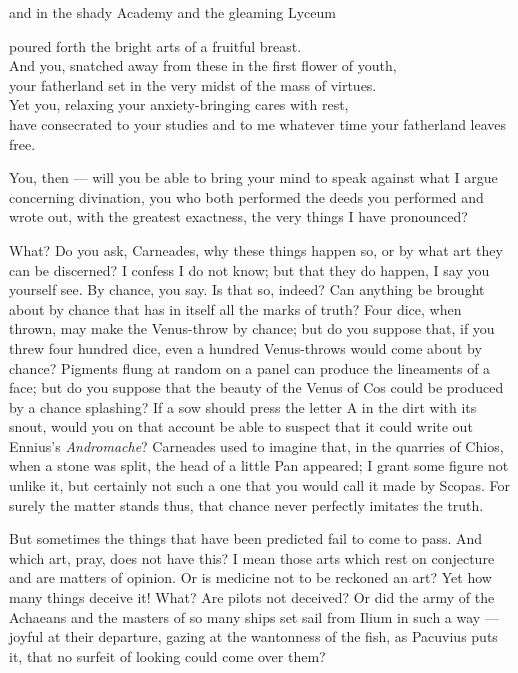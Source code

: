  and in the shady Academy and the gleaming Lyceum

poured forth the bright arts of a fruitful breast. \\
And you, snatched away from these in the first flower of youth, \\
your fatherland set in the very midst of the mass of virtues. \\
Yet you, relaxing your anxiety-bringing cares with rest, \\
have consecrated to your studies and to me whatever time your fatherland leaves free.

You, then — will you be able to bring your mind to speak against what I argue concerning divination, you who both performed the deeds you performed and wrote out, with the greatest exactness, the very things I have pronounced?

 What? Do you ask, Carneades, why these things happen so, or by what art they can be discerned? I confess I do not know; but that they do happen, I say you yourself see. By chance, you say. Is that so, indeed? Can anything be brought about by chance that has in itself all the marks of truth? Four dice, when thrown, may make the Venus-throw by chance; but do you suppose that, if you threw four hundred dice, even a hundred Venus-throws would come about by chance? Pigments flung at random on a panel can produce the lineaments of a face; but do you suppose that the beauty of the Venus of Cos could be produced by a chance splashing? If a sow should press the letter A in the dirt with its snout, would you on that account be able to suspect that it could write out Ennius's \textit{Andromache}? Carneades used to imagine that, in the quarries of Chios, when a stone was split, the head of a little Pan appeared; I grant some figure not unlike it, but certainly not such a one that you would call it made by Scopas. For surely the matter stands thus, that chance never perfectly imitates the truth.

 But sometimes the things that have been predicted fail to come to pass. And which art, pray, does not have this? I mean those arts which rest on conjecture and are matters of opinion. Or is medicine not to be reckoned an art? Yet how many things deceive it! What? Are pilots not deceived? Or did the army of the Achaeans and the masters of so many ships set sail from Ilium in such a way — joyful at their departure, gazing at the wantonness of the fish, as Pacuvius puts it, that no surfeit of looking could come over them?

